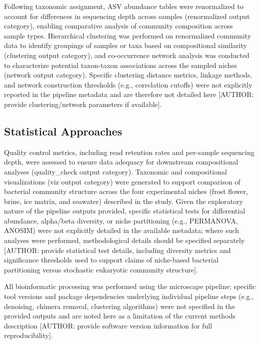 \documentclass[
  11pt,
]{article}
\begin{document}
Following taxonomic assignment, ASV abundance tables were renormalized
to account for differences in sequencing depth across samples
(renormalized output category), enabling comparative analysis of
community composition across sample types. Hierarchical clustering was
performed on renormalized community data to identify groupings of
samples or taxa based on compositional similarity (clustering output
category), and co-occurrence network analysis was conducted to
characterize potential taxon-taxon associations across the sampled
niches (network output category). Specific clustering distance metrics,
linkage methods, and network construction thresholds (e.g., correlation
cutoffs) were not explicitly reported in the pipeline metadata and are
therefore not detailed here {[}AUTHOR: provide clustering/network
parameters if available{]}.

\subsection{Statistical Approaches}\label{statistical-approaches}

Quality control metrics, including read retention rates and per-sample
sequencing depth, were assessed to ensure data adequacy for downstream
compositional analyses (quality\_check output category). Taxonomic and
compositional visualizations (viz output category) were generated to
support comparison of bacterial community structure across the four
experimental niches (frost flower, brine, ice matrix, and seawater)
described in the study. Given the exploratory nature of the pipeline
outputs provided, specific statistical tests for differential abundance,
alpha/beta diversity, or niche partitioning (e.g., PERMANOVA, ANOSIM)
were not explicitly detailed in the available metadata; where such
analyses were performed, methodological details should be specified
separately {[}AUTHOR: provide statistical test details, including
diversity metrics and significance thresholds used to support claims of
niche-based bacterial partitioning versus stochastic eukaryotic
community structure{]}.

All bioinformatic processing was performed using the microscape
pipeline; specific tool versions and package dependencies underlying
individual pipeline steps (e.g., denoising, chimera removal, clustering
algorithms) were not specified in the provided outputs and are noted
here as a limitation of the current methods description {[}AUTHOR:
provide software version information for full reproducibility{]}.
\end{document}
